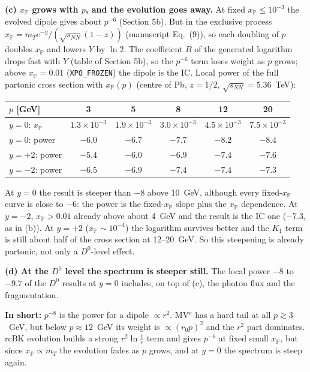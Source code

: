 \documentclass[12pt]{article}
\begin{document}
\textbf{(c) $x_{\mathbb P}$ grows with $p$, and the evolution goes away.} At fixed $x_{\mathbb P}\le10^{-3}$ the
evolved dipole gives about $p^{-6}$ (Section 5b). But in the exclusive process
$x_{\mathbb P}=m_Te^{-y}/(\sqrt{s_{NN}}(1-z))$ (manuscript Eq.~(9)), so each doubling of $p$ doubles
$x_{\mathbb P}$ and lowers $Y$ by $\ln2$. The coefficient $B$ of the generated logarithm drops fast with $Y$
(table of Section 5b), so the $p^{-6}$ term loses weight as $p$ grows; above $x_{\mathbb P}=0.01$
(\texttt{XPO\_FROZEN}) the dipole is the IC. Local power of the full partonic cross section with
$x_{\mathbb P}(p)$ (centre of Pb, $z=1/2$, $\sqrt{s_{NN}}=5.36$~TeV):
\begin{center}
\begin{tabular}{lccccc}
\toprule
$p$ [GeV] & 3 & 5 & 8 & 12 & 20 \\
\midrule
$y=0$: $x_{\mathbb P}$ & $1.3\times10^{-3}$ & $1.9\times10^{-3}$ & $3.0\times10^{-3}$ & $4.5\times10^{-3}$ & $7.5\times10^{-3}$ \\
$y=0$: power & $-6.0$ & $-6.7$ & $-7.7$ & $-8.2$ & $-8.4$ \\
$y=+2$: power & $-5.4$ & $-6.0$ & $-6.9$ & $-7.4$ & $-7.6$ \\
$y=-2$: power & $-6.5$ & $-6.9$ & $-7.4$ & $-7.4$ & $-7.3$ \\
\bottomrule
\end{tabular}
\end{center}
At $y=0$ the result is steeper than $-8$ above 10~GeV, although every fixed-$x_{\mathbb P}$ curve is close
to $-6$: the power is the fixed-$x_{\mathbb P}$ slope plus the $x_{\mathbb P}$ dependence. At $y=-2$,
$x_{\mathbb P}>0.01$ already above about 4~GeV and the result is the IC one ($-7.3$, as in (b)). At
$y=+2$ ($x_{\mathbb P}\sim10^{-4}$) the logarithm survives better and the $K_1$ term is still about half of
the cross section at 12--20~GeV. So this steepening is already partonic, not only a $D^0$-level effect.

\textbf{(d) At the $D^0$ level the spectrum is steeper still.} The local power $-8$ to $-9.7$ of the $D^0$
results at $y=0$ includes, on top of (c), the photon flux and the fragmentation.

\textbf{In short:} $p^{-8}$ is the power for a dipole $\propto r^2$. MV$^e$ has a hard tail at all
$p\gtrsim3$~GeV, but below $p\approx12$~GeV its weight is $\propto(r_0p)^2$ and the $r^2$ part dominates.
rcBK evolution builds a strong $r^2\ln\frac1r$ term and gives $p^{-6}$ at fixed small $x_{\mathbb P}$, but
since $x_{\mathbb P}\propto m_T$ the evolution fades as $p$ grows, and at $y=0$ the spectrum is steep again.
\end{document}
